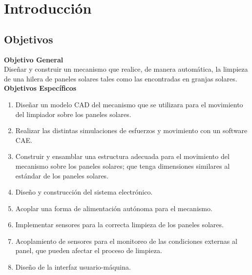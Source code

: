 \chapter{Introducción}\label{cap1}

\section{Objetivos}
\textbf{Objetivo General}\\
Diseñar y construir un mecanismo que realice, de manera automática, la limpieza de una hilera de paneles solares tales como las encontradas en granjas solares.\\
\textbf{Objetivos Específicos}
\begin{enumerate}
    \item Diseñar un modelo CAD del mecanismo que se utilizara para el movimiento del limpiador sobre los paneles solares.
    \item Realizar las distintas simulaciones de esfuerzos y movimiento con un software CAE.
    \item Construir y ensamblar una estructura adecuada para el movimiento del mecanismo sobre los paneles solares; que tenga dimensiones similares al estándar de los paneles solares.
    \item Diseño y construcción del sistema electrónico.
    \item Acoplar una forma de alimentación autónoma para el mecanismo.
    \item Implementar sensores para la correcta limpieza de los paneles solares.
    \item Acoplamiento de sensores para el monitoreo de las condiciones externas al panel, que pueden afectar el proceso de limpieza.
    \item Diseño de la interfaz usuario-máquina.
\end{enumerate}

